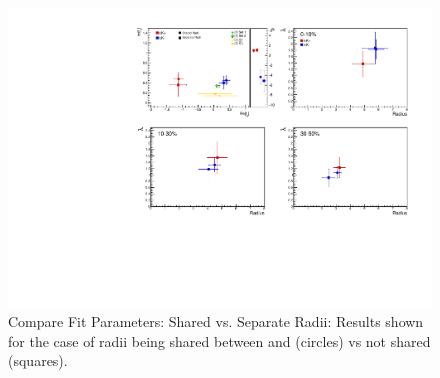\documentclass[../AnalysisNoteJBuxton.tex]{subfiles}
\begin{document}
\begin{figure}[h]
  \centering
  \includegraphics[width=\textwidth]{7_ResultsAndDiscussion/Figures/CompareAllScattParams_CompSharedvsSepR_StatOnly.pdf}
  \caption[Compare Fit Parameters: Shared vs. Separate Radii]{Compare Fit Parameters: Shared vs. Separate Radii:  Results shown for the case of radii being shared between \LamKchPALamKchM and \LamKchMALamKchP (circles) vs not shared (squares).}
  \label{fig:CompareAllScattParams_SharevsSepR}
\end{figure}



\clearpage
\end{document}

